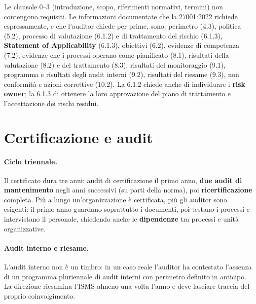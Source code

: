 \begin{integrazione}
Le clausole 0--3 (introduzione, scopo, riferimenti normativi, termini) non contengono requisiti. Le
informazioni documentate che la 27001:2022 richiede espressamente, e che l'auditor chiede per prime, sono:
perimetro (4.3), politica (5.2), processo di valutazione (6.1.2) e di trattamento del rischio (6.1.3),
\textbf{Statement of Applicability} (6.1.3), obiettivi (6.2), evidenze di competenza (7.2), evidenze che i
processi operano come pianificato (8.1), risultati della valutazione (8.2) e del trattamento (8.3),
risultati del monitoraggio (9.1), programma e risultati degli audit interni (9.2), risultati del riesame
(9.3), non conformità e azioni correttive (10.2). La 6.1.2 chiede anche di individuare i \textbf{risk
owner}; la 6.1.3 di ottenere la loro approvazione del piano di trattamento e l'accettazione dei rischi
residui.
\end{integrazione}

\section{Certificazione e audit}
\label{sec:iso-certificazione}
\paragraph{Ciclo triennale.} Il certificato dura tre anni: audit di certificazione il primo anno,
\textbf{due audit di mantenimento} negli anni successivi (su parti della norma), poi
\textbf{ricertificazione} completa. Più a lungo un'organizzazione è certificata, più gli auditor sono
esigenti: il primo anno guardano soprattutto i documenti, poi testano i processi e intervistano il
personale, chiedendo anche le \textbf{dipendenze} tra processi e unità organizzative.

\paragraph{Audit interno e riesame.} L'audit interno non è un timbro: in un caso reale l'auditor ha
contestato l'assenza di un programma pluriennale di audit interni con perimetro definito in anticipo. La
direzione riesamina l'ISMS almeno una volta l'anno e deve lasciare traccia del proprio coinvolgimento.

